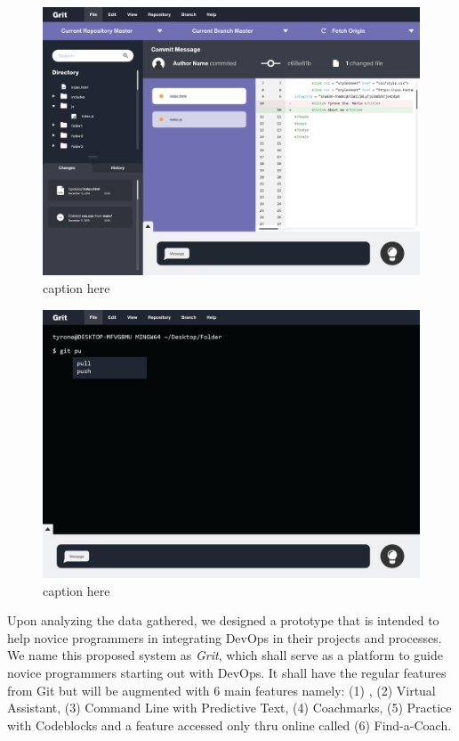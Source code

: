 \documentclass{sigchi}
\begin{document}
\begin{figure}
    \centering
    \includegraphics[scale=0.72]{figures/mockup1}
    \caption{caption here }
    \label{fig:mockup}
\end{figure}

\begin{figure}
    \centering
    \includegraphics[scale=0.72]{figures/console1}
    \caption{caption here }
    \label{fig:console}
\end{figure}

Upon analyzing the data gathered, we designed a prototype that is intended to help novice programmers in integrating DevOps in their projects and processes. We name this proposed system as \textit{Grit}, which shall serve as a platform to guide novice programmers starting out with DevOps. It shall have the regular features from Git but will be augmented with 6 main features namely: (1) , (2) Virtual Assistant, (3) Command Line with Predictive Text, (4) Coachmarks, (5) Practice with Codeblocks and a feature accessed only thru online called (6) Find-a-Coach. 
\end{document}
